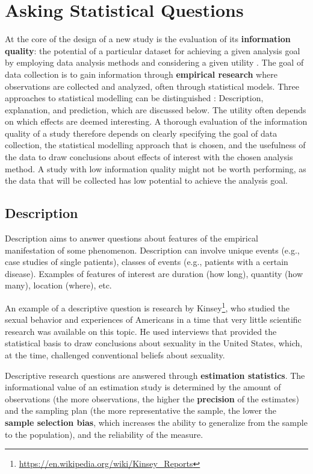 \documentclass[
  oneside]{krantz}
\renewcommand{\href}[2]{#2\footnote{\url{#1}}}
\begin{document}
\hypertarget{questions}{%
\chapter{Asking Statistical Questions}\label{questions}}

At the core of the design of a new study is the evaluation of its \textbf{information quality}: the potential of a particular dataset for achieving a given analysis goal by employing data analysis methods and considering a given utility
\citep{kenett_information_2016}. The goal of data collection is to gain information through \textbf{empirical research} where observations are collected and analyzed, often through statistical models. Three approaches to statistical modelling can be distinguished \citet{shmueli_explain_2010}: Description, explanation, and prediction, which are discussed below. The utility often depends on which effects are deemed interesting. A thorough evaluation of the information quality of a study therefore depends on clearly specifying the goal of data collection, the statistical modelling approach that is chosen, and the usefulness of the data to draw conclusions about effects of interest with the chosen analysis method. A study with low information quality might not be worth performing, as the data that will be collected has low potential to achieve the analysis goal.

\hypertarget{description}{%
\section{Description}\label{description}}

Description aims to answer questions about features of the empirical manifestation of some phenomenon. Description can involve unique events (e.g., case studies of single patients), classes of events (e.g., patients with a certain disease). Examples of features of interest are duration (how long), quantity (how many), location (where), etc.

An example of a descriptive question is research by \href{https://en.wikipedia.org/wiki/Kinsey_Reports}{Kinsey}, who studied the sexual behavior and experiences of Americans in a time that very little scientific research was available on this topic. He used interviews that provided the statistical basis to draw conclusions about sexuality in the United States, which, at the time, challenged conventional beliefs about sexuality.

Descriptive research questions are answered through \textbf{estimation statistics}. The informational value of an estimation study is determined by the amount of observations (the more observations, the higher the \textbf{precision} of the estimates) and the sampling plan (the more representative the sample, the lower the \textbf{sample selection bias}, which increases the ability to generalize from the sample to the population), and the reliability of the measure.
\end{document}
